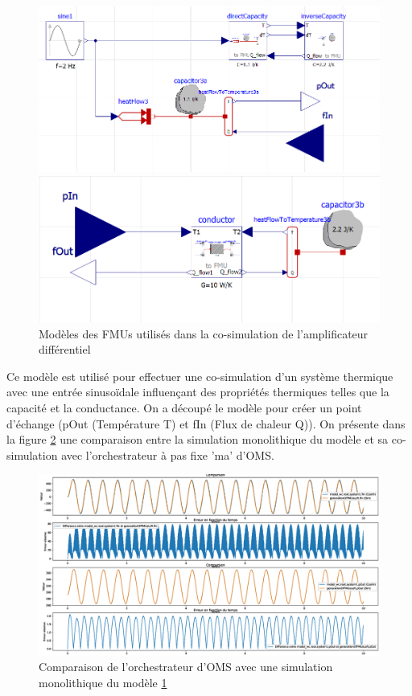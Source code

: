\begin{figure}[hbt!]
    \centering
    \begin{minipage}[b]{0.45\textwidth}
        \includegraphics[width=\textwidth]{GenerationfmuL.png}
    \end{minipage}
    \begin{minipage}[b]{0.45\textwidth}
      \includegraphics[width=\textwidth]{GenerationfmuR.png}
  \end{minipage}
  \caption{Modèles des FMUs utilisés dans la co-simulation de l'amplificateur différentiel}
  \label{fig:23}
  \end{figure}
Ce modèle est utilisé pour effectuer une co-simulation d'un système thermique avec une entrée sinusoïdale influençant des propriétés thermiques telles que la capacité et la conductance. On a découpé le modèle pour créer un point d'échange (pOut (Température T) et fIn (Flux de chaleur Q)). On présente dans la figure \ref{fig:24} une comparaison entre la simulation monolithique du modèle et sa co-simulation avec l'orchestrateur à pas fixe 'ma' d'OMS.

\begin{figure}[hbt!]
    \centering
    \includegraphics[width =\textwidth]{generationFMUOMS.eps}
    \caption{Comparaison de l'orchestrateur d'OMS avec une simulation monolithique du modèle \ref{fig:23}}
    \label{fig:24}
\end{figure}

